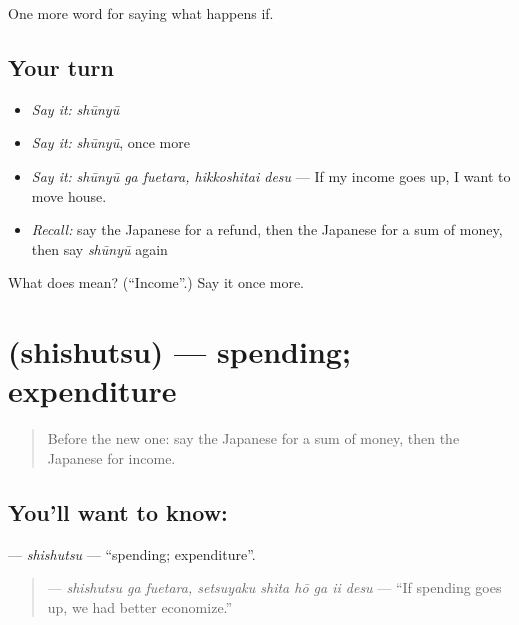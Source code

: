 \begin{grammarlens}[title={What you've built}]
One more word for saying what happens if.
\end{grammarlens}

\subsection*{Your turn}
\begin{itemize}
\raggedright
  \item \emph{Say it:} \emph{shūnyū}
  \item \emph{Say it:} \emph{shūnyū}, once more
  \item \emph{Say it:} \emph{shūnyū ga fuetara, hikkoshitai desu} — If my income goes up, I want to move house.
  \item \emph{Recall:} say the Japanese for a refund, then the Japanese for a sum of money, then say \emph{shūnyū} again
\end{itemize}

\begin{tcolorbox}[breakable,colback=teal!4,colframe=teal!35!black,title={Before you move on}]
What does  mean? (\textquotedblleft{}Income\textquotedblright{}.) Say it once more.
\end{tcolorbox}
\section[\texorpdfstring{\ja{ししゅつ} (shishutsu)}{ししゅつ (shishutsu)}]{ (shishutsu) — spending; expenditure}

\label{lesson:JA-C360-shishutsu}



\begin{quote}
Before the new one: say the Japanese for a sum of money, then the Japanese for income.
\end{quote}

\subsection*{You'll want to know: }
\textbf{} — \emph{shishutsu} — \textquotedblleft{}spending; expenditure\textquotedblright{}.

\begin{quote}
\textbf{   } — \emph{shishutsu ga fuetara, setsuyaku shita hō ga ii desu} — \textquotedblleft{}If spending goes up, we had better economize.\textquotedblright{}
\end{quote}

